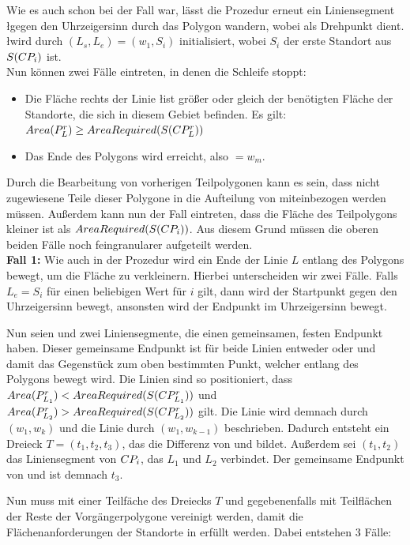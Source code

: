 \documentclass[ngerman]{seminarbeitrag}
\begin{document}
Wie es auch schon bei \con der Fall war, lässt die Prozedur erneut ein Liniensegment \l gegen den Uhrzeigersinn durch das Polygon \cpi wandern, wobei \ls als Drehpunkt dient. \l wird durch $(L_{s}, L_{e}) = (w_{1}, S_{i})$ initialisiert, wobei $S_{i}$ der erste Standort aus $S(CP_{i})$ ist.\\
Nun können zwei Fälle eintreten, in denen die Schleife stoppt:

\begin{itemize}
\item Die Fläche rechts der Linie \l ist größer oder gleich der benötigten Fläche der Standorte, die sich in diesem Gebiet befinden. Es gilt:
$Area(P_{L}^{r})\ge AreaRequired(S(CP_{L}^{r}))$
\item Das Ende des Polygons wird erreicht, also \Le $= w_{m}$.
\end{itemize}

Durch die Bearbeitung von vorherigen Teilpolygonen kann es sein, dass nicht zugewiesene Teile dieser Polygone in die Aufteilung von \cpi miteinbezogen werden müssen. Außerdem kann nun der Fall eintreten, dass die Fläche des Teilpolygons kleiner ist als $AreaRequired(S(CP_{i}))$. Aus diesem Grund müssen die oberen beiden Fälle noch feingranularer aufgeteilt werden.\\

\textbf{Fall 1:} Wie auch in der Prozedur \con wird ein Ende der Linie $L$ entlang des Polygons bewegt, um die Fläche \ar{\mprl}zu verkleinern. Hierbei unterscheiden wir zwei Fälle. Falls $L_{e} = S_{i}$ für einen beliebigen Wert für $i$ gilt, dann wird der Startpunkt \ls gegen den Uhrzeigersinn bewegt, ansonsten wird der Endpunkt \Le im Uhrzeigersinn bewegt.

Nun seien \leins und \lzwei zwei Liniensegmente, die einen gemeinsamen, festen Endpunkt haben. Dieser gemeinsame Endpunkt ist für beide Linien entweder \ls oder \Le und damit das Gegenstück zum oben bestimmten Punkt, welcher entlang des Polygons bewegt wird. Die Linien sind so positioniert, dass $Area(P^{r}_{L_{1}}) < AreaRequired(S(CP^{r}_{L_{1}}))$ und $Area(P^{r}_{L_{2}}) > AreaRequired(S(CP^{r}_{L_{2}}))$ gilt. Die Linie \lzwei wird demnach durch $(w_{1}, w_{k})$ und die Linie \leins durch $(w_{1}, w_{k-1})$ beschrieben.
Dadurch entsteht ein Dreieck $T = (t_{1}, t_{2}, t_{3})$, das die Differenz von \cprleins und \cprlzwei bildet. Außerdem sei $(t_{1}, t_{2})$ das Liniensegment von $CP_{i}$, das $L_{1}$ und $L_{2}$ verbindet. Der gemeinsame Endpunkt von \leins und \lzwei ist demnach $t_{3}$.

Nun muss \cprleins mit einer Teilfäche des Dreiecks $T$ und gegebenenfalls mit Teilflächen der Reste der Vorgängerpolygone vereinigt werden, damit die Flächenanforderungen der Standorte in \cprleins erfüllt werden. Dabei entstehen 3 Fälle:
\end{document}
